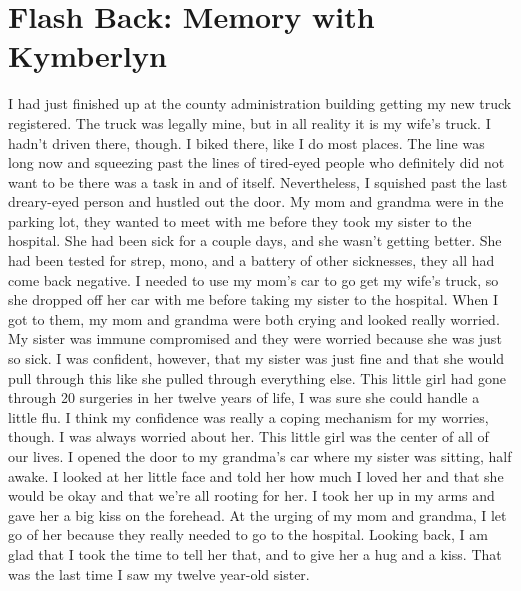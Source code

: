 \documentclass[12pt, letterpaper]{article}
\begin{document}
\section*{Flash Back: Memory with Kymberlyn}
% 
% 
I had just finished up at the county administration building getting my new truck registered.
The truck was legally mine, but in all reality it is my wife's truck.
I hadn't driven there, though. 
I biked there, like I do most places.
The line was long now and squeezing past the lines of tired-eyed people
who definitely did not want to be there was a task in and of itself.
Nevertheless, I squished past the last dreary-eyed person and hustled out the door.
My mom and grandma were in the parking lot, they wanted to meet with me before they took my sister
to the hospital.
She had been sick for a couple days, and she wasn't getting better.
She had been tested for strep, mono, and a battery of other sicknesses, 
they all had come back negative.
I needed to use my mom's car to go get my wife's truck, so she
dropped off her car with me before taking my sister to the hospital.
When I got to them, my mom and grandma were both crying and looked really worried.
My sister was immune compromised and they were worried because she was just so sick.
I was confident, however, that my sister was just fine and that she would pull
through this like she pulled through everything else.
This little girl had gone through 20 surgeries in her twelve years of life, 
I was sure she could handle a little flu.
I think my confidence was really a coping mechanism for my worries, though.
I was always worried about her. 
This little girl was the center of all of our lives. 
I opened the door to my grandma's car where my sister was sitting, half awake.
I looked at her little face and told her how much I loved her and that she would be okay
and that we're all rooting for her.
I took her up in my arms and gave her a big kiss on the forehead.
At the urging of my mom and grandma, I let go of her because they really needed to go to the hospital.
Looking back, I am glad that I took the time to tell her that, and to give her a hug and a kiss.
That was the last time I saw my twelve year-old sister.
\end{document}
